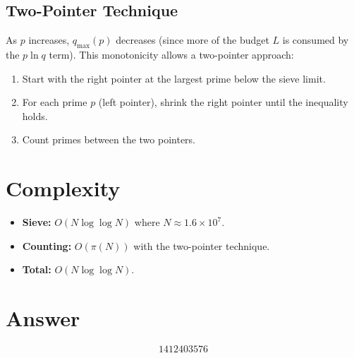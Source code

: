 \documentclass[12pt]{article}
\begin{document}
\subsection{Two-Pointer Technique}
As $p$ increases, $q_{\max}(p)$ decreases (since more of the budget $L$ is consumed by the $p \ln q$ term). This monotonicity allows a two-pointer approach:
\begin{enumerate}
    \item Start with the right pointer at the largest prime below the sieve limit.
    \item For each prime $p$ (left pointer), shrink the right pointer until the inequality holds.
    \item Count primes between the two pointers.
\end{enumerate}

\section{Complexity}
\begin{itemize}
    \item \textbf{Sieve:} $O(N \log \log N)$ where $N \approx 1.6 \times 10^7$.
    \item \textbf{Counting:} $O(\pi(N))$ with the two-pointer technique.
    \item \textbf{Total:} $O(N \log \log N)$.
\end{itemize}

\section{Answer}

\[
\boxed{1412403576}
\]
\end{document}
